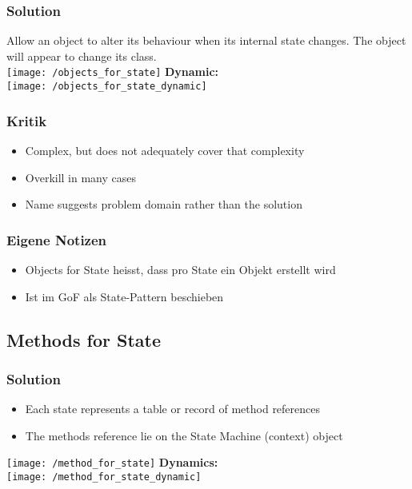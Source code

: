 \subsubsection{Solution}
Allow an object to alter its behaviour when its internal state changes. The object will appear to change its class.\\ 
\texttt{[image: /objects\_for\_state]}
\textbf{Dynamic:}\\
\texttt{[image: /objects\_for\_state\_dynamic]}
\subsubsection{Kritik}
\begin{itemize}[topsep=0pt]
    \itemsep -0.4em
    \item Complex, but does not adequately cover that complexity
    \item Overkill in many cases
    \item Name suggests problem domain rather than the solution
\end{itemize}
\subsubsection{Eigene Notizen}
\begin{itemize}[topsep=0pt]
    \itemsep -0.4em
    \item Objects for State heisst, dass pro State ein Objekt erstellt wird
    \item Ist im GoF als State-Pattern beschieben
\end{itemize}

\subsection{Methods for State}
\subsubsection{Solution}
\begin{itemize}[topsep=0pt]
    \itemsep -0.4em
    \item Each state represents a table or record of method references
    \item The methods reference lie on the State Machine (context) object
\end{itemize}
\texttt{[image: /method\_for\_state]}
\textbf{Dynamics:}\\ 
\texttt{[image: /method\_for\_state\_dynamic]}
